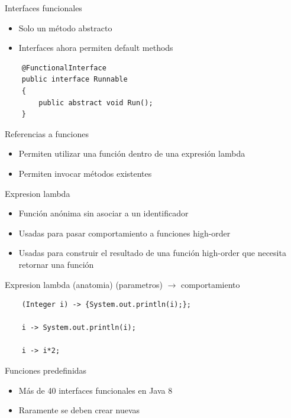 \documentclass{beamer}
\begin{document}
\begin{frame}[fragile]{Interfaces funcionales}
	\begin{itemize}
	\item Solo un método abstracto
	\item Interfaces ahora permiten default methods
	\end{itemize}
	\begin{lstlisting}
	@FunctionalInterface
	public interface Runnable
	{
		public abstract void Run();
	}
	\end{lstlisting}
\end{frame}

\begin{frame}{Referencias a funciones}
	\begin{itemize}
	\item Permiten utilizar una función dentro de una expresión lambda
	\item Permiten invocar métodos existentes
	\end{itemize}
\end{frame}

\begin{frame}{Expresion lambda}
	\begin{itemize}
	\item Función anónima sin asociar a un identificador
	\item Usadas para pasar comportamiento a funciones high-order
	\item Usadas para construir el resultado de una función high-order que necesita retornar una función
	\end{itemize}
\end{frame}

\begin{frame}[fragile]{Expresion lambda (anatomia)}
	(parametros)  $\to$ {comportamiento}
	
	\begin{lstlisting}
	(Integer i) -> {System.out.println(i);};
		
	i -> System.out.println(i);
	    
	i -> i*2;
	\end{lstlisting}
\end{frame}

\begin{frame}{Funciones predefinidas}
	\begin{itemize}
	\item Más de 40 interfaces funcionales en Java 8
	\item Raramente se deben crear nuevas
	\end{itemize}
\end{frame}
\end{document}
